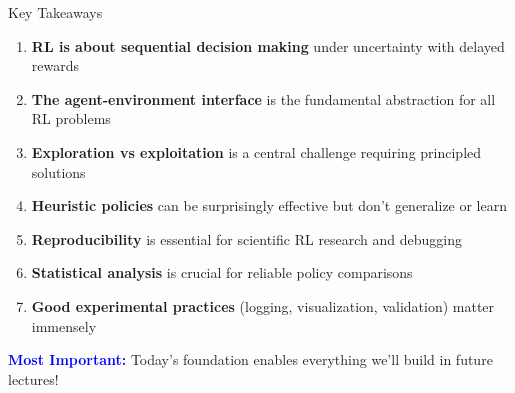 \documentclass[aspectratio=169,10pt]{beamer}
\begin{document}
\begin{frame}{Key Takeaways}

\begin{enumerate}
    \item \textbf{RL is about sequential decision making} under uncertainty with delayed rewards

    \item \textbf{The agent-environment interface} is the fundamental abstraction for all RL problems

    \item \textbf{Exploration vs exploitation} is a central challenge requiring principled solutions

    \item \textbf{Heuristic policies} can be surprisingly effective but don't generalize or learn

    \item \textbf{Reproducibility} is essential for scientific RL research and debugging

    \item \textbf{Statistical analysis} is crucial for reliable policy comparisons

    \item \textbf{Good experimental practices} (logging, visualization, validation) matter immensely
\end{enumerate}

\vfill

\textcolor{blue}{\textbf{Most Important:}} Today's foundation enables everything we'll build in future lectures!

\end{frame}
\end{document}
